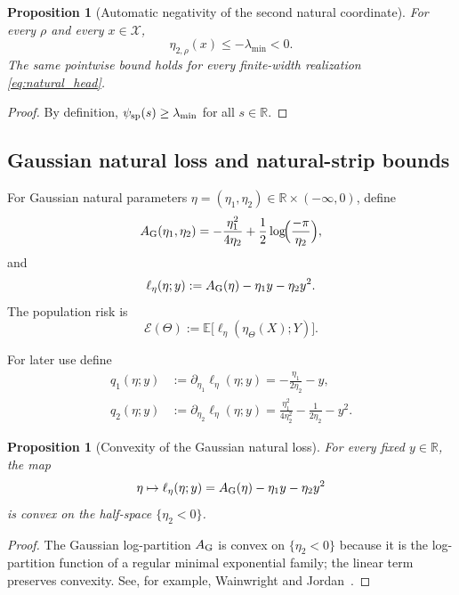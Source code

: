 \documentclass[11pt]{article}
\newtheorem{proposition}[theorem]{Proposition}
\theoremstyle{definition}
\newcommand{\R}{\mathbb{R}}
\newcommand{\E}{\mathbb{E}}
\newcommand{\mc}[1]{\mathcal{#1}}
\newcommand{\cE}{\mathcal{E}}
\begin{document}
\begin{proposition}[Automatic negativity of the second natural coordinate]
\label{prop:softplus-domain-k1}
For every $\rho$ and every $x\in\mc{X}$,
\[
  \eta_{2,\rho}(x)\le -\lambda_{\min}<0.
\]
The same pointwise bound holds for every finite-width realization
\eqref{eq:natural_head}.
\end{proposition}

\begin{proof}
By definition, $\psi_{\rm sp}(s)\ge \lambda_{\min}$ for all $s\in\R$.
\end{proof}

\subsection{Gaussian natural loss and natural-strip bounds}

For Gaussian natural parameters
$\eta=(\eta_1,\eta_2)\in \R\times(-\infty,0)$, define
\[
  A_{\rm G}(\eta_1,\eta_2)
  =
  -\frac{\eta_1^2}{4\eta_2}
  +
  \frac12\log\!\Bigl(\frac{-\pi}{\eta_2}\Bigr),
\]
and
\begin{equation}
  \ell_\eta(\eta;y)
  :=
  A_{\rm G}(\eta)-\eta_1 y-\eta_2 y^2.
  \label{eq:gaussian_nll_eta}
\end{equation}
The population risk is
\begin{equation}
  \cE(\Theta)
  :=
  \E\big[\ell_\eta(\eta_\Theta(X);Y)\big].
  \label{eq:population_risk}
\end{equation}

For later use define
\begin{align}
  q_1(\eta;y)
  &:=
  \partial_{\eta_1}\ell_\eta(\eta;y)
  =
  -\frac{\eta_1}{2\eta_2}-y,
  \label{eq:q1-k1}
  \\
  q_2(\eta;y)
  &:=
  \partial_{\eta_2}\ell_\eta(\eta;y)
  =
  \frac{\eta_1^2}{4\eta_2^2}
  -
  \frac{1}{2\eta_2}
  -
  y^2.
  \label{eq:q2-k1}
\end{align}

\begin{proposition}[Convexity of the Gaussian natural loss]
\label{prop:gaussian-natural-convexity}
For every fixed $y\in\R$, the map
\[
  \eta\mapsto \ell_\eta(\eta;y)=A_{\rm G}(\eta)-\eta_1 y-\eta_2 y^2
\]
is convex on the half-space $\{\eta_2<0\}$.
\end{proposition}

\begin{proof}
The Gaussian log-partition $A_{\rm G}$ is convex on $\{\eta_2<0\}$ because it
is the log-partition function of a regular minimal exponential family; the
linear term preserves convexity. See, for example,
Wainwright and Jordan~\cite{WainwrightJordan2008}.
\end{proof}
\end{document}
